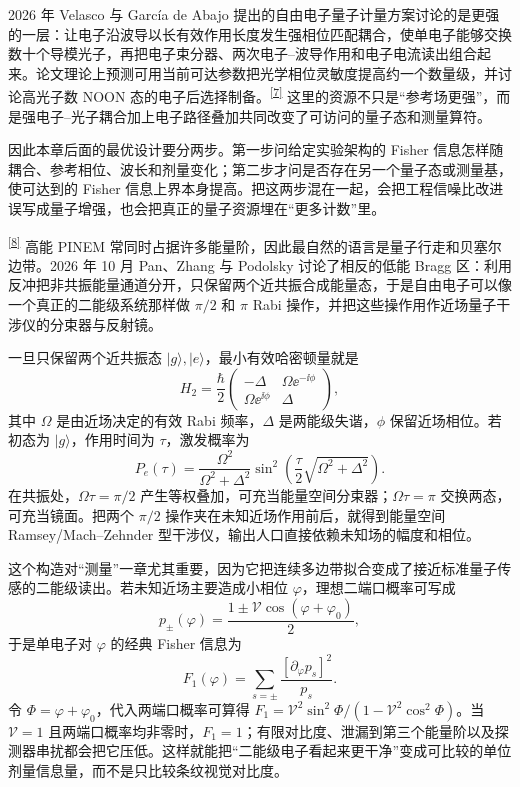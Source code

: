 2026 年 Velasco 与 García de Abajo 提出的自由电子量子计量方案讨论的是更强的一层：让电子沿波导以长有效作用长度发生强相位匹配耦合，使单电子能够交换数十个导模光子，再把电子束分器、两次电子--波导作用和电子电流读出组合起来。论文理论上预测可用当前可达参数把光学相位灵敏度提高约一个数量级，并讨论高光子数 NOON 态的电子后选择制备。\textsuperscript{\hyperref[ch07-ref7]{[7]}} 这里的资源不只是“参考场更强”，而是强电子--光子耦合加上电子路径叠加共同改变了可访问的量子态和测量算符。

因此本章后面的最优设计要分两步。第一步问给定实验架构的 Fisher 信息怎样随耦合、参考相位、波长和剂量变化；第二步才问是否存在另一个量子态或测量基，使可达到的 Fisher 信息上界本身提高。把这两步混在一起，会把工程信噪比改进误写成量子增强，也会把真正的量子资源埋在“更多计数”里。

\textsuperscript{\hyperref[ch07-ref8]{[8]}}
高能 PINEM 常同时占据许多能量阶，因此最自然的语言是量子行走和贝塞尔边带。2026 年 10 月 Pan、Zhang 与 Podolsky 讨论了相反的低能 Bragg 区：利用反冲把非共振能量通道分开，只保留两个近共振合成能量态，于是自由电子可以像一个真正的二能级系统那样做 $\pi/2$ 和 $\pi$ Rabi 操作，并把这些操作用作近场量子干涉仪的分束器与反射镜。

一旦只保留两个近共振态 $|g\rangle,|e\rangle$，最小有效哈密顿量就是
\begin{equation}
H_{2}=\frac{\hbar}{2}
\begin{pmatrix}
-\Delta & \Omega \ee^{-\ii\phi}\\
\Omega \ee^{\ii\phi} & \Delta
\end{pmatrix},
\label{eq:ch07-twolevel-electron}
\end{equation}
其中 $\Omega$ 是由近场决定的有效 Rabi 频率，$\Delta$ 是两能级失谐，$\phi$ 保留近场相位。若初态为 $|g\rangle$，作用时间为 $\tau$，激发概率为
\begin{equation}
P_e(\tau)=\frac{\Omega^2}{\Omega^2+\Delta^2}
\sin^2\!\left(\frac{\tau}{2}\sqrt{\Omega^2+\Delta^2}\right).
\label{eq:ch07-rabi-probability}
\end{equation}
在共振处，$\Omega\tau=\pi/2$ 产生等权叠加，可充当能量空间分束器；$\Omega\tau=\pi$ 交换两态，可充当镜面。把两个 $\pi/2$ 操作夹在未知近场作用前后，就得到能量空间 Ramsey/Mach--Zehnder 型干涉仪，输出人口直接依赖未知场的幅度和相位。

这个构造对“测量”一章尤其重要，因为它把连续多边带拟合变成了接近标准量子传感的二能级读出。若未知近场主要造成小相位 $\varphi$，理想二端口概率可写成
\begin{equation}
p_\pm(\varphi)=\frac{1\pm\mathcal V\cos(\varphi+\varphi_0)}{2},
\label{eq:ch07-twolevel-fringes}
\end{equation}
于是单电子对 $\varphi$ 的经典 Fisher 信息为
\begin{equation}
F_1(\varphi)=\sum_{s=\pm}\frac{[\partial_\varphi p_s]^2}{p_s}.
\label{eq:ch07-twolevel-fisher}
\end{equation}
令 $\Phi=\varphi+\varphi_0$，代入两端口概率可算得 $F_1=\mathcal V^2\sin^2\Phi/(1-\mathcal V^2\cos^2\Phi)$。当 $\mathcal V=1$ 且两端口概率均非零时，$F_1=1$；有限对比度、泄漏到第三个能量阶以及探测器串扰都会把它压低。这样就能把“二能级电子看起来更干净”变成可比较的单位剂量信息量，而不是只比较条纹视觉对比度。

